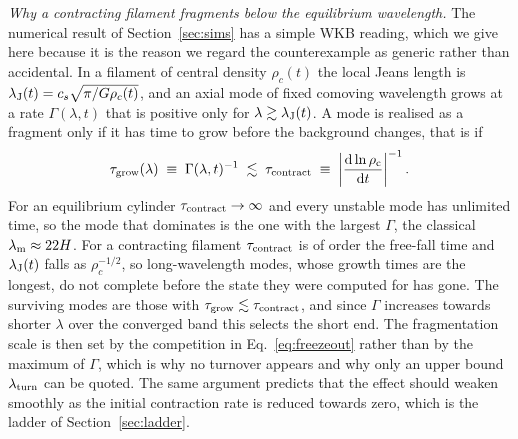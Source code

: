 \documentclass[usenatbib,twoside,twocolumn]{mnras}
\begin{document}
\emph{Why a contracting filament fragments below the equilibrium wavelength.} The numerical result of Section~\ref{sec:sims} has a simple WKB reading, which we give here because it is the reason we regard the counterexample as generic rather than accidental. In a filament of central density $\rho_c(t)$ the local Jeans length is $\lambda_{\rm J}(t)=c_s\sqrt{\pi/G\rho_c(t)}$, and an axial mode of fixed comoving wavelength grows at a rate $\Gamma(\lambda,t)$ that is positive only for $\lambda\gtrsim\lambda_{\rm J}(t)$. A mode is realised as a fragment only if it has time to grow before the background changes, that is if
\begin{equation}
\tau_{\rm grow}(\lambda)\;\equiv\;\Gamma(\lambda,t)^{-1}\;\lesssim\;\tau_{\rm contract}\;\equiv\;\left|\frac{\rm d\ln\rho_c}{{\rm d}t}\right|^{-1}.
\label{eq:freezeout}
\end{equation}
For an equilibrium cylinder $\tau_{\rm contract}\to\infty$ and every unstable mode has unlimited time, so the mode that dominates is the one with the largest $\Gamma$, the classical $\lambda_{\rm m}\approx22H$. For a contracting filament $\tau_{\rm contract}$ is of order the free-fall time and $\lambda_{\rm J}(t)$ falls as $\rho_c^{-1/2}$, so long-wavelength modes, whose growth times are the longest, do not complete before the state they were computed for has gone. The surviving modes are those with $\tau_{\rm grow}\lesssim\tau_{\rm contract}$, and since $\Gamma$ increases towards shorter $\lambda$ over the converged band this selects the short end. The fragmentation scale is then set by the competition in Eq.~\ref{eq:freezeout} rather than by the maximum of $\Gamma$, which is why no turnover appears and why only an upper bound $\lambda_{\rm turn}$ can be quoted. The same argument predicts that the effect should weaken smoothly as the initial contraction rate is reduced towards zero, which is the ladder of Section~\ref{sec:ladder}.




\bsp
\label{lastpage}
\end{document}
